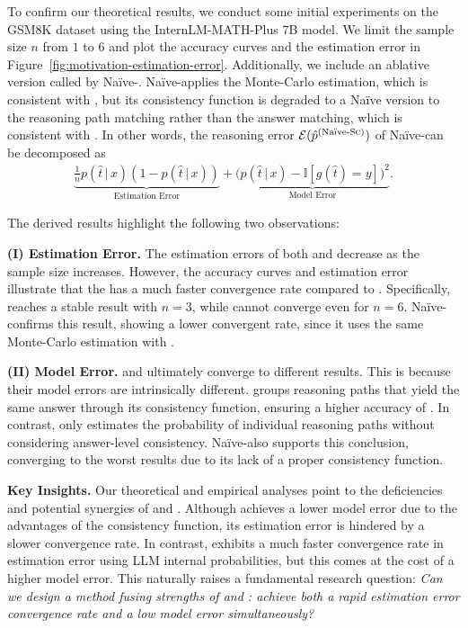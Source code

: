 To confirm our theoretical results, we conduct some initial experiments on the GSM8K dataset using the InternLM-MATH-Plus 7B model. We limit the sample size $n$ from $1$ to $6$ and plot the accuracy curves and the estimation error in Figure~\ref{fig:motivation-estimation-error}.
Additionally, we include an ablative version called by Na\"{i}ve-\SC. 
Na\"{i}ve-\SC applies the Monte-Carlo estimation, which is consistent with \SC, 
but its consistency function is degraded to a Na\"{i}ve version to the reasoning path matching rather than the answer matching, which is consistent with \PP.
In other words, the reasoning error $\mathcal{E}(\hat{p}^{(\text{Na\"{i}ve-}\textsc{Sc})})$ of Na\"{i}ve-\SC can be decomposed as
\begin{equation*}
    \begin{aligned}
        \underbrace{\frac{1}{n} p(\hat{t} \,|\, x) (1- p(\hat{t}\,|\, x))}_{\text{Estimation Error}}  +  \underbrace{\big (p(\hat{t} \,|\, x) - \mathbb{I}[g(\hat{t}) = y] \big )^2}_{\text{Model Error}}. 
    \end{aligned}
\end{equation*}

The derived results highlight the following two observations:

\textbf{(I) Estimation Error.}
The estimation errors of both \SC and \PP decrease as the sample size increases. 
However, the accuracy curves and estimation error illustrate that the \PP has a much faster convergence rate compared to \SC. 
Specifically, \PP reaches a stable result with $n=3$, while \SC cannot converge even for $n=6$.
Na\"{i}ve-\SC confirms this result, showing a lower convergent rate, since it uses the same Monte-Carlo estimation with \SC.

\textbf{(II) Model Error.}
\SC and \PP ultimately converge to different results. This is because their model errors are intrinsically different. \SC groups reasoning paths that yield the same answer through its consistency function, ensuring a higher accuracy of \SC. In contrast, \PP only estimates the probability of individual reasoning paths without considering answer-level consistency. Na\"{i}ve-\SC also supports this conclusion, converging to the worst results due to its lack of a proper consistency function.

{\bf Key Insights.} 
Our theoretical and empirical analyses point to the deficiencies and potential synergies of \SC and \PP. 
Although \SC achieves a lower model error due to the advantages of the consistency function, its estimation error is hindered by a slower convergence rate. In contrast, \PP exhibits a much faster convergence rate in estimation error using LLM internal probabilities, but this comes at the cost of a higher model error. This naturally raises a fundamental research question: \emph{Can we design a method fusing strengths of \SC and \PP: achieve both a rapid estimation error convergence rate and a low model error simultaneously?}